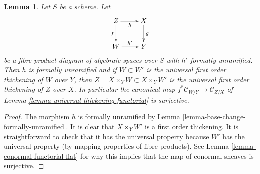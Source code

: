 \documentclass[10pt,a4paper]{amsart}
\theoremstyle{plain}
\newtheorem{lemma}[subsection]{Lemma}
\theoremstyle{definition}
\theoremstyle{remark}
\numberwithin{equation}{subsection}
\begin{document}
\begin{lemma}
\label{lemma-universal-thickening-fibre-product}
Let $S$ be a scheme. Let
$$
\xymatrix{
Z \ar[r]_h \ar[d]_f & X \ar[d]^g \\
W \ar[r]^{h'} & Y
}
$$
be a fibre product diagram of algebraic spaces over $S$ with
$h'$ formally unramified. Then $h$ is formally unramified and if
$W \subset W'$ is the universal first order thickening of $W$ over $Y$,
then $Z = X \times_Y W \subset X \times_Y W'$ is the universal
first order thickening of $Z$ over $X$. In particular the canonical map
$f^*\mathcal{C}_{W/Y} \to \mathcal{C}_{Z/X}$ of
Lemma \ref{lemma-universal-thickening-functorial}
is surjective.
\end{lemma}

\begin{proof}
The morphism $h$ is formally unramified by
Lemma \ref{lemma-base-change-formally-unramified}.
It is clear that $X \times_Y W'$ is a first order thickening.
It is straightforward to check that it has the universal property
because $W'$ has the universal property (by mapping properties of
fibre products). See
Lemma \ref{lemma-conormal-functorial-flat}
for why this implies that the map of conormal sheaves is surjective.
\end{proof}
\end{document}
